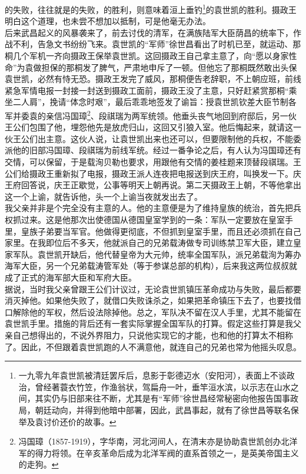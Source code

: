 的失败，往往就是的失败，的胜利，则意味着洹上垂钓\footnote{一九零九年袁世凯被清廷罢斥后，息影于彰德迈水（安阳河），表面上不谈政治，曾经著蓑衣竹笠，作渔翁状，驾扁舟一叶，垂竿洹水滨，以示志在山水之间，其实仍与旧部来往不断，尤其是有“军师”徐世昌经常秘密向他报告国事政局，朝廷动向，并得到他暗中部署，因此，武昌事起，就有了徐世昌等联名保举及袁讨价还价的故事。}的袁世凯的胜利。摄政王明白这个道理，也未尝不想加以抵制，可是他毫无办法。\\

后来武昌起义的风暴袭来了，前去讨伐的清军，在满族陆军大臣荫昌的统率下，作战不利，告急文书纷纷飞来。袁世凯的“军师”徐世昌看出了时机已至，就运动、那桐几个军机一齐向摄政王保举袁世凯。这回摄政王自己拿主意了，向“愿以身家性命”为袁做担保的那桐发了脾气，严肃地申斥了一顿。但他忘了那桐既然敢出头保袁世凯，必然有恃无恐。摄政王发完了威风，那桐便告老辞职，不上朝应班，前线紧急军情电报一封接一封送到摄政工面前，摄政王没了主意，只好赶紧赏那桐“乘坐二人肩”，挽请“体念时艰”，最后乖乖地签发了谕旨：授袁世凯钦差大臣节制各军并委袁的亲信冯国璋\footnote{冯国璋（1857-1919），字华南，河北河间人，在清末亦是协助袁世凯创办北洋军的得力将领。在辛亥革命后成为北洋军阀的直系首领之一，是英美帝国主义的走狗。}、段祺瑞为两军统领。他垂头丧气地回到府邸后，另一伙王公们包围了他，埋怨他先是放虎归山，这回又引狼入室。他后悔起来，就请这一伙王公们出主意。这伙人说，让袁世凯出来也还可以，但要限制他的兵权，不能委派他的旧部冯国璋、段祺瑞为前线军统。经过一番争论之后，有人认为冯国璋还有交情，可以保留，于是载洵贝勒也要求，用跟他有交情的姜桂题来顶替段祺瑞。王公们给摄政王重新拟了电报，摄政王派人连夜把电报送到庆王府，叫换发一下。庆王府回答说，庆王正歇觉，公事等明天上朝再说。第二天摄政王上朝，不等他拿出这一个上谕，就告诉他，头一个上谕当夜就发出去了。\\

我父亲并非是个完全没有主意的人。他的主意便是为了维持皇族的统治，首先把兵权抓过来。这是他那次出使德国从德国皇室学到的一条：军队一定要放在皇室手里，皇族子弟要当军官。他做得更彻底，不但抓到皇室手里，而且还必须抓在自己家里。在我即位后不多天，他就派自己的兄弟载涛做专司训练禁卫军大臣，建立皇家军队。袁世凯开缺后，他代替皇帝为大元帅，统率全国军队，派兄弟载洵为筹办海军大臣，另一个兄弟载涛管军处（等于参谋总部的机构），后来我这两位叔叔就成了正式的海军部大臣和军府大臣。\\

据说，当时我父亲曾跟王公们计议过，无论袁世凯镇压革命成功与失败，最后都要消灭掉他。如果他失败了，就借口失败诛杀之，如果把革命镇压下去了，也要找借口解除他的军权，然后设法除掉他。总之，军队决不留在汉人手里，尤其不能留在袁世凯手里。措施的背后还有一套实际掌握全国军队的打算。假定这些打算是我父亲自己想得出的，不说外界阻力，只说他实现它的才能，也和他的打算太不相称了。因此，不但跟着袁世凯跑的人不满意他，就连自己的兄弟也常为他摇头叹息。\\

